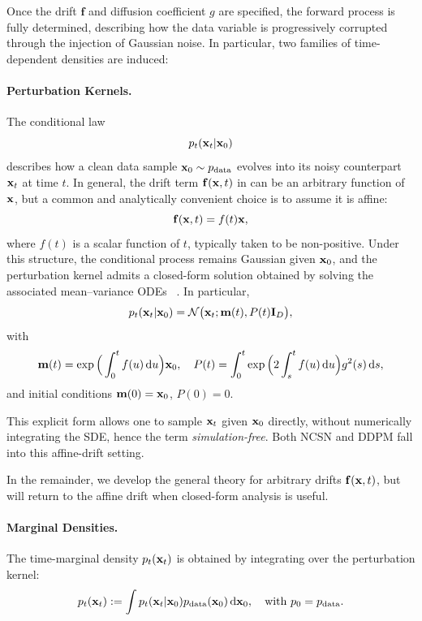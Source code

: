 Once the drift $\mathbf{f}$ and diffusion coefficient $g$ are specified, the forward process is fully determined, describing how the data variable is progressively corrupted through the injection of Gaussian noise. In particular, two families of time-dependent densities are induced:
\paragraph{Perturbation Kernels.} 
The conditional law
\[
p_t({\mathbf{x}}_t |{\mathbf{x}}_0)
\]
describes how a clean data sample $ {\mathbf{x}}_0 \sim p_{\mathrm{data}} $ evolves into its noisy counterpart ${\mathbf{x}}_t$ at time $t$. In general, the drift term ${\mathbf{f}}({\mathbf{x}},t)$ in  can be an arbitrary function of ${\mathbf{x}}$, but a common and analytically convenient choice is to assume it is affine:
\begin{equation}\label{eq:affine-drift}
    {\mathbf{f}}({\mathbf{x}},t) = f(t) {\mathbf{x}}, 
\end{equation}
where $f(t)$ is a scalar function of $t$, typically taken to be non-positive. 
Under this structure, the conditional process remains Gaussian given
${\mathbf{x}}_0$, and the perturbation kernel admits a closed-form solution obtained
by solving the associated mean--variance ODEs~\citep{sarkka2019applied}
 \nkh{)}. {In particular,
\[
p_t({\mathbf{x}}_t |{\mathbf{x}}_0) = \mathcal{N} \big({\mathbf{x}}_t; {\mathbf{m}}(t), P(t)\mathbf I_D\big),
\]
with
\[
{\mathbf{m}}(t) = \exp \Big(\int_0^t f(u) \mathop{}\!\mathrm{d} u\Big) {\mathbf{x}}_0,
\quad
P(t) = \int_0^t \exp \Big(2 \int_s^t f(u) \mathop{}\!\mathrm{d} u\Big) g^2(s) \mathop{}\!\mathrm{d} s,
\]
and initial conditions ${\mathbf{m}}(0)={\mathbf{x}}_0$, $P(0)=0$.}

This explicit form allows one to sample ${\mathbf{x}}_t$ given ${\mathbf{x}}_0$ directly, without numerically integrating the SDE, hence the term \emph{simulation-free}. Both NCSN and DDPM fall into this affine-drift setting. 

In the remainder, we develop the general theory for arbitrary drifts ${\mathbf{f}}({\mathbf{x}},t)$, but will return to the affine drift when closed-form analysis is useful.



\paragraph{Marginal Densities.} 
The time-marginal density $ p_t({\mathbf{x}}_t) $ is obtained by integrating over the perturbation kernel:
\begin{equation}\label{eq:scoresde-oracle-marginal}
    p_t({\mathbf{x}}_t) := \int p_t({\mathbf{x}}_t|{\mathbf{x}}_0) p_{\mathrm{data}}({\mathbf{x}}_0) \mathop{}\!\mathrm{d} {\mathbf{x}}_0, \quad \text{with } p_0 = p_{\mathrm{data}}.
\end{equation}

